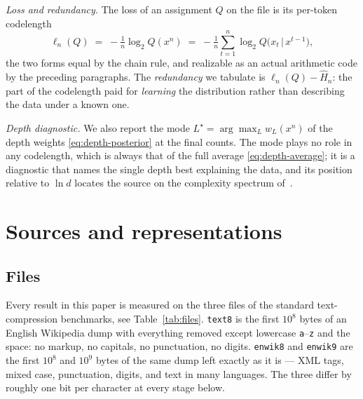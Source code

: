 \documentclass[11pt]{article}
\begin{document}
\emph{Loss and redundancy.}  The loss of an assignment $Q$ on the
file is its per-token codelength
\begin{equation}
\label{eq:codelength}
  \ell_n(Q) \;=\; -\tfrac{1}{n}\log_2 Q(x^n)
  \;=\; -\tfrac{1}{n}\sum_{t=1}^{n}
        \log_2 Q\bigl(x_t \,\big|\, x^{t-1}\bigr),
\end{equation}
the two forms equal by the chain rule, and realizable as an actual
arithmetic code by the preceding paragraphs.  The \emph{redundancy}
we tabulate is $\ell_n(Q) - \hat H_n$: the part of the codelength
paid for \emph{learning} the distribution rather than describing the
data under a known one.

\emph{Depth diagnostic.}  We also report the mode
$L^\star = \arg\max_L w_L(x^n)$ of the depth weights
\eqref{eq:depth-posterior} at the final counts.  The mode plays no
role in any codelength, which is always that of the full average
\eqref{eq:depth-average}; it is a diagnostic that names the single
depth best explaining the data, and its position relative to
$\ln d$ locates the source on the complexity spectrum
of~\cite{layered2026}.

\section{Sources and representations}
\label{sec:sources}

\subsection*{Files}

Every result in this paper is measured on the three files of the
standard text-compression benchmarks, see Table~\ref{tab:files}.
\texttt{text8} is the first $10^8$ bytes of an English Wikipedia dump
with everything removed except lowercase \texttt{a}--\texttt{z} and the
space: no markup, no capitals, no punctuation, no digits.
\texttt{enwik8} and \texttt{enwik9} are the first $10^8$ and $10^9$
bytes of the same dump left exactly as it is --- XML tags, mixed case,
punctuation, digits, and text in many languages.  The three differ by roughly one bit per character at every
stage below.
\end{document}
